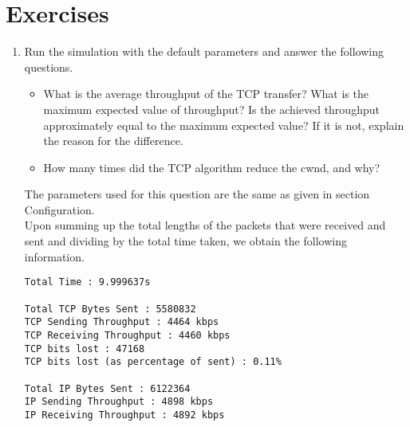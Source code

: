 \documentclass[a4paper]{article}
\begin{document}
  \section*{Exercises}
\begin{enumerate}  
\item  Run the simulation with the default parameters and answer the following questions.
\begin{itemize}
	\item What is the average throughput of the TCP transfer? What is the maximum expected value of throughput? Is the achieved throughput approximately equal to the maximum expected value? If it is not, explain the reason for the difference. 
	\item  How many times did the TCP algorithm reduce the cwnd, and why? 
\end{itemize}
The parameters used for this question are the same as given in section Configuration.\\
Upon summing up the total lengths of the packets that were received and sent and dividing by the total time taken, we obtain the following information.
\begin{verbatim}
Total Time : 9.999637s

Total TCP Bytes Sent : 5580832
TCP Sending Throughput : 4464 kbps
TCP Receiving Throughput : 4460 kbps
TCP bits lost : 47168
TCP bits lost (as percentage of sent) : 0.11%

Total IP Bytes Sent : 6122364
IP Sending Throughput : 4898 kbps
IP Receiving Throughput : 4892 kbps


\end{verbatim}
\end{enumerate}
\end{document}
